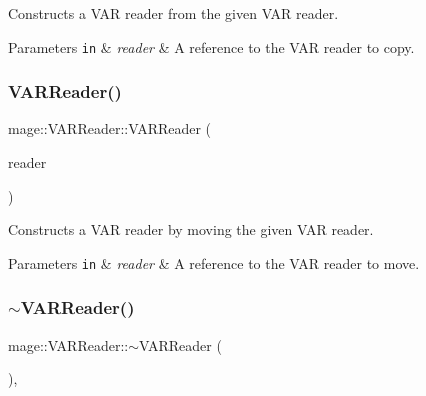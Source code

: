 Constructs a V\+AR reader from the given V\+AR reader.


\begin{DoxyParams}[1]{Parameters}
\mbox{\tt in}  & {\em reader} & A reference to the V\+AR reader to copy. \\
\hline
\end{DoxyParams}
\hypertarget{classmage_1_1_v_a_r_reader_a04ff7eec105ce7c0700e0a2e7ef740f3}{}\label{classmage_1_1_v_a_r_reader_a04ff7eec105ce7c0700e0a2e7ef740f3} 
\subsubsection{\texorpdfstring{V\+A\+R\+Reader()}{VARReader()}\hspace{0.1cm}{\footnotesize\ttfamily [3/3]}}
{\footnotesize\ttfamily mage\+::\+V\+A\+R\+Reader\+::\+V\+A\+R\+Reader (\begin{DoxyParamCaption}\item[{\hyperlink{classmage_1_1_v_a_r_reader}{V\+A\+R\+Reader} \&\&}]{reader }\end{DoxyParamCaption})\hspace{0.3cm}{\ttfamily [default]}}

Constructs a V\+AR reader by moving the given V\+AR reader.


\begin{DoxyParams}[1]{Parameters}
\mbox{\tt in}  & {\em reader} & A reference to the V\+AR reader to move. \\
\hline
\end{DoxyParams}
\hypertarget{classmage_1_1_v_a_r_reader_ad6d33cedc71285380eeda74e45e4a1d2}{}\label{classmage_1_1_v_a_r_reader_ad6d33cedc71285380eeda74e45e4a1d2} 
\subsubsection{\texorpdfstring{$\sim$\+V\+A\+R\+Reader()}{~VARReader()}}
{\footnotesize\ttfamily mage\+::\+V\+A\+R\+Reader\+::$\sim$\+V\+A\+R\+Reader (\begin{DoxyParamCaption}{ }\end{DoxyParamCaption})\hspace{0.3cm}{\ttfamily [virtual]}, {\ttfamily [default]}}

